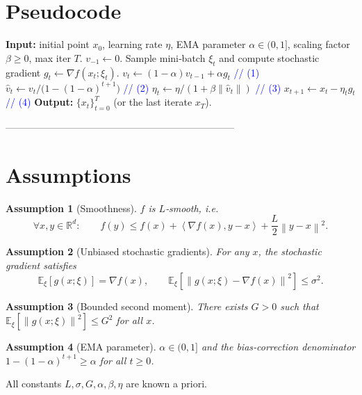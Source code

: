 \documentclass{article}
\newcommand{\E}{\mathbb{E}}
\newcommand{\R}{\mathbb{R}}
\newcommand{\norm}[1]{\left\|#1\right\|}
\newcommand{\ip}[2]{\left\langle #1,#2\right\rangle}
\newcommand{\grad}{\nabla}
\newtheorem{assumption}{Assumption}
\begin{document}
\section*{Pseudocode}
\begin{algorithm}[H]
\caption{EMA‑VSSGD}
\begin{algorithmic}[1]
\STATE \textbf{Input:} initial point $x_{0}$, learning rate $\eta$, EMA parameter $\alpha\in(0,1]$, scaling factor $\beta\ge0$, max iter $T$.
\STATE $v_{-1}\leftarrow 0$.
    \STATE Sample mini‑batch $\xi_{t}$ and compute stochastic gradient $g_{t}\gets\grad f(x_{t};\xi_{t})$.
    \STATE $v_{t}\gets (1-\alpha)v_{t-1}+\alpha g_{t}$ \hfill\textcolor{blue}{// (1)}
    \STATE $\hat v_{t}\gets v_{t}/\bigl(1-(1-\alpha)^{t+1}\bigr)$ \hfill\textcolor{blue}{// (2)}
    \STATE $\eta_{t}\gets \eta/(1+\beta\|\hat v_{t}\|)$ \hfill\textcolor{blue}{// (3)}
    \STATE $x_{t+1}\gets x_{t}-\eta_{t} g_{t}$ \hfill\textcolor{blue}{// (4)}
\ENDFOR
\STATE \textbf{Output:} $\{x_{t}\}_{t=0}^{T}$ (or the last iterate $x_{T}$).
\end{algorithmic}
\end{algorithm}

-----------------------------------------------------------------------

\section*{Assumptions}
\begin{assumption}[Smoothness]\label{ass:smooth}
$f$ is $L$‑smooth, i.e.
\[
\forall x,y\in\R^{d}:\qquad
f(y)\le f(x)+\ip{\grad f(x)}{y-x}+\frac{L}{2}\norm{y-x}^{2}.
\tag{A1}
\]
\end{assumption}
\begin{assumption}[Unbiased stochastic gradients]\label{ass:unbiased}
For any $x$, the stochastic gradient satisfies
\[
\E_{\xi}[g(x;\xi)] = \grad f(x),\qquad 
\E_{\xi}\!\left[\norm{g(x;\xi)-\grad f(x)}^{2}\right]\le\sigma^{2}.
\tag{A2}
\]
\end{assumption}
\begin{assumption}[Bounded second moment]\label{ass:bounded}
There exists $G>0$ such that $\E_{\xi}\!\left[\norm{g(x;\xi)}^{2}\right]\le G^{2}$ for all $x$.
\end{assumption}
\begin{assumption}[EMA parameter]\label{ass:alpha}
$\alpha\in(0,1]$ and the bias‑correction denominator $1-(1-\alpha)^{t+1}\ge \alpha$ for all $t\ge0$.
\end{assumption}
All constants $L,\sigma,G,\alpha,\beta,\eta$ are known a priori.
\end{document}
